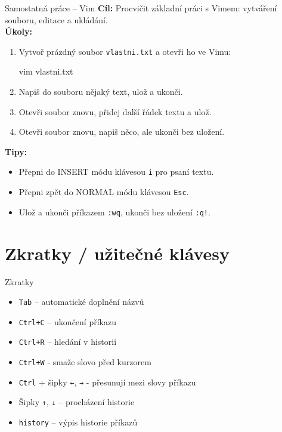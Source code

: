 \documentclass{beamer}
\begin{document}
\begin{frame}{Samostatná práce – Vim}
\small
\textbf{Cíl:} Procvičit základní práci s Vimem: vytváření souboru, editace a ukládání.\\[0.5em]

\textbf{Úkoly:}
\begin{enumerate}
  \item Vytvoř prázdný soubor \texttt{vlastni.txt} a otevři ho ve Vimu:
  \begin{semiverbatim}
vim vlastni.txt
  \end{semiverbatim}
  \item Napiš do souboru nějaký text, ulož a ukonči.
  \item Otevři soubor znovu, přidej další řádek textu a ulož.
  \item Otevři soubor znovu, napiš něco, ale ukonči bez uložení.
\end{enumerate}

\textbf{Tipy:}
\begin{itemize}
  \item Přepni do INSERT módu klávesou \texttt{i} pro psaní textu.
  \item Přepni zpět do NORMAL módu klávesou \texttt{Esc}.
  \item Ulož a ukonči příkazem \texttt{:wq}, ukonči bez uložení \texttt{:q!}.
\end{itemize}
\end{frame}

  \section{Zkratky / užitečné klávesy}
  \begin{frame}{Zkratky}
    \begin{itemize}
      \item \texttt{Tab} – automatické doplnění názvů
      \item \texttt{Ctrl+C} – ukončení příkazu
      \item \texttt{Ctrl+R} – hledání v historii
      \item \texttt{Ctrl+W} - smaže slovo před kurzorem
      \item \texttt{Ctrl} + šipky \texttt{←}, \texttt{→} - přesunují mezi slovy příkazu
      \item Šipky \texttt{↑}, \texttt{↓} – procházení historie
      \item \texttt{history} – výpis historie příkazů
    \end{itemize}
  \end{frame}
\end{document}
